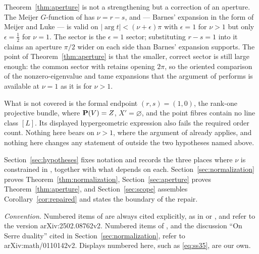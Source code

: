 Theorem~\ref{thm:aperture} is not a strengthening but a correction of an
aperture.  The Meijer \(G\)-function of \cite[Lemma~7.4]{SS} has
\(\nu=r-s\), and \cite[Theorem~A.1]{SS} --- Barnes' expansion in the form
of Meijer \cite{Meijer} and Luke \cite{Luke} --- is valid on
\(|\arg t|<(\nu+\epsilon)\pi\) with \(\epsilon=1\) for \(\nu>1\) but only
\(\epsilon=\tfrac12\) for \(\nu=1\).  The sector \cite[(64)]{SS} is the
\(\epsilon=1\) sector; substituting \(r-s=1\) into it claims an aperture
\(\pi/2\) wider on each side than Barnes' expansion supports.  The point of
Theorem~\ref{thm:aperture} is that the smaller, correct sector is still
large enough: the common sector with \cite[Proposition~8.2]{SS} retains
opening \(2\pi\), so the oriented comparison of the nonzero-eigenvalue and
tame expansions that the argument of \cite[Section~9]{SS} performs is
available at \(\nu=1\) as it is for \(\nu>1\).

What is not covered is the formal endpoint \((r,s)=(1,0)\), the rank-one
projective bundle, where \(\mathbf P(V)=Z\), \(X'=\varnothing\), and the point
fibres contain no line class \([L]\).  Its displayed hypergeometric expression
also fails the required order count.  Nothing here bears on \(\nu>1\), where
the argument of \cite{SS} already applies, and nothing here changes any
statement of \cite{SS} outside the two hypotheses named above.

Section~\ref{sec:hypotheses} fixes notation and records the three places
where \(\nu\) is constrained in \cite{SS}, together with what depends on
each.  Section~\ref{sec:normalization} proves
Theorem~\ref{thm:normalization}, Section~\ref{sec:aperture} proves
Theorem~\ref{thm:aperture}, and Section~\ref{sec:scope} assembles
Corollary~\ref{cor:repaired} and states the boundary of the repair.

\medskip
\noindent\emph{Convention.}  Numbered items of \cite{SS} are always cited
explicitly, as in \cite[Theorem~4.4]{SS} or \cite[(35)]{SS}, and refer to
the version arXiv:2502.08762v2.  Numbered items of \cite{CoatesGivental},
and the discussion ``On Serre duality'' cited in
Section~\ref{sec:normalization}, refer to arXiv:math/0110142v2.  Displays numbered here, such as
\eqref{eq:ss35}, are our own.
